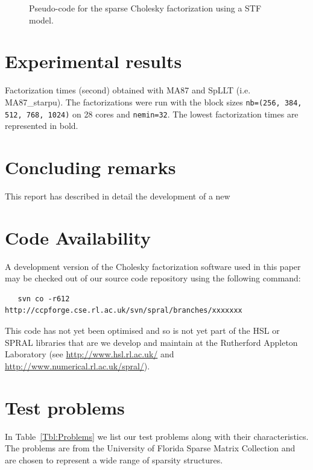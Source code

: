 \documentclass{article}
\begin{document}
\begin{figure}[!h]
  \centering 
\caption{\label{fig:activation-pseudocode-1d}Pseudo-code for the
  sparse Cholesky factorization using a STF model.}
\end{figure}

\section{Experimental results}\label{sec:experiments}

\begin{table}[htbp]
    \begin{center}
      
    \end{center}
    \caption{Factorization times (second) obtained with MA87 and SpLLT
      (i.e. MA87\_starpu). The factorizations were run with the block
      sizes \texttt{nb=(256, 384, 512, 768, 1024)} on 28 cores and
      \texttt{nemin=32}. The lowest factorization times are
      represented in bold.}
\end{table}

\section{Concluding remarks}\label{sec:conclusions}
This report has described in detail the development of a new

 
\section*{Code Availability}
A development version of the Cholesky factorization software used in this 
paper may be checked out of
our source code repository using the following command:

\begin{verbatim}
   svn co -r612 http://ccpforge.cse.rl.ac.uk/svn/spral/branches/xxxxxxx
\end{verbatim}

This code has not yet been optimised and so is not yet
part of the HSL or SPRAL libraries that are we develop
and maintain at the Rutherford Appleton Laboratory (see
\url{http://www.hsl.rl.ac.uk/} and \url{http://www.numerical.rl.ac.uk/spral/}).

\clearpage


\appendix

\section{Test problems}\label{appendix}
\setcounter{equation}{0}
\setcounter{table}{0}
\setcounter{figure}{0}
\setcounter{table}{0}
\renewcommand{\thetable}{A.\arabic{table}}


In Table~\ref{Tbl:Problems} we list  our test problems along with 
their characteristics. The problems are from the 
University of Florida Sparse Matrix Collection  and are chosen 
to represent a wide range of sparsity structures.
\end{document}
